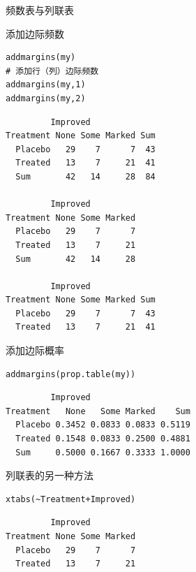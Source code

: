 \documentclass[presentation]{beamer}
\begin{document}
\begin{frame}[fragile,label={sec:org96fa602}]{频数表与列联表}
 \begin{block}{添加边际频数}
\begin{verbatim}
addmargins(my)
# 添加行（列）边际频数
addmargins(my,1)
addmargins(my,2)
\end{verbatim}

\begin{verbatim}
         Improved
Treatment None Some Marked Sum
  Placebo   29    7      7  43
  Treated   13    7     21  41
  Sum       42   14     28  84

         Improved
Treatment None Some Marked
  Placebo   29    7      7
  Treated   13    7     21
  Sum       42   14     28

         Improved
Treatment None Some Marked Sum
  Placebo   29    7      7  43
  Treated   13    7     21  41
\end{verbatim}
\end{block}

\begin{block}{添加边际概率}
\begin{verbatim}
addmargins(prop.table(my))
\end{verbatim}

\begin{verbatim}
         Improved
Treatment   None   Some Marked    Sum
  Placebo 0.3452 0.0833 0.0833 0.5119
  Treated 0.1548 0.0833 0.2500 0.4881
  Sum     0.5000 0.1667 0.3333 1.0000
\end{verbatim}
\end{block}

\begin{block}{列联表的另一种方法}
\begin{verbatim}
xtabs(~Treatment+Improved)
\end{verbatim}

\begin{verbatim}
         Improved
Treatment None Some Marked
  Placebo   29    7      7
  Treated   13    7     21
\end{verbatim}
\end{block}
\end{frame}
\end{document}
